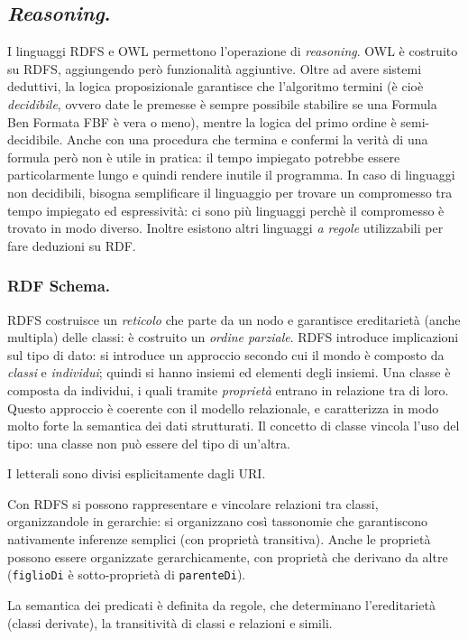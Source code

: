 \documentclass[11pt]{article}
\begin{document}
\begin{multicols}{2}
\subsection{\textit{Reasoning}.}
I linguaggi RDFS e OWL permettono l'operazione di \textit{reasoning}.
OWL è costruito su RDFS, aggiungendo però funzionalità aggiuntive.
Oltre ad avere sistemi deduttivi, la logica proposizionale garantisce che l'algoritmo termini (è cioè \textit{decidibile}, ovvero date le premesse è sempre possibile stabilire se una Formula Ben Formata FBF è vera o meno), mentre la logica del primo ordine è semi-decidibile.
Anche con una procedura che termina e confermi la verità di una formula però non è utile in pratica: il tempo impiegato potrebbe essere particolarmente lungo e quindi rendere inutile il programma.
In caso di linguaggi non decidibili, bisogna semplificare il linguaggio per trovare un compromesso tra tempo impiegato ed espressività: ci sono più linguaggi perchè il compromesso è trovato in modo diverso.
Inoltre esistono altri linguaggi \textit{a regole} utilizzabili per fare deduzioni su RDF.

\subsubsection{RDF Schema.}
RDFS costruisce un \textit{reticolo} che parte da un nodo e garantisce ereditarietà (anche multipla) delle classi: è costruito un \textit{ordine parziale}.
RDFS introduce implicazioni sul tipo di dato: si introduce un approccio secondo cui il mondo è composto da \textit{classi} e \textit{individui}; quindi si hanno insiemi ed elementi degli insiemi.
Una classe è composta da individui, i quali tramite \textit{proprietà} entrano in relazione tra di loro.
Questo approccio è coerente con il modello relazionale, e caratterizza in modo molto forte la semantica dei dati strutturati.
Il concetto di classe vincola l'uso del tipo: una classe non può essere del tipo di un'altra.

I letterali sono divisi esplicitamente dagli URI.

Con RDFS si possono rappresentare e vincolare relazioni tra classi, organizzandole in gerarchie: si organizzano così tassonomie che garantiscono nativamente inferenze semplici (con proprietà transitiva).
Anche le proprietà possono essere organizzate gerarchicamente, con proprietà che derivano da altre (\verb|figlioDi| è sotto-proprietà di \verb|parenteDi|).

La semantica dei predicati è definita da regole, che determinano l'ereditarietà (classi derivate), la transitività di classi e relazioni e simili.


\end{multicols}
\end{document}
